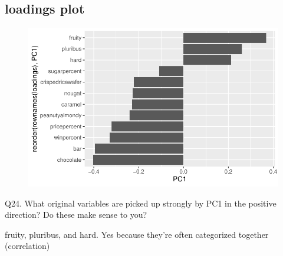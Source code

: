 \documentclass[
  letterpaper,
  DIV=11,
  numbers=noendperiod]{scrartcl}
\newenvironment{Shaded}{\begin{snugshade}}{\end{snugshade}}
\newcommand{\FunctionTok}[1]{\textcolor[rgb]{0.28,0.35,0.67}{#1}}
\newcommand{\NormalTok}[1]{\textcolor[rgb]{0.00,0.23,0.31}{#1}}
\newcommand{\OtherTok}[1]{\textcolor[rgb]{0.00,0.23,0.31}{#1}}
\newcommand{\SpecialCharTok}[1]{\textcolor[rgb]{0.37,0.37,0.37}{#1}}
\begin{document}
\hypertarget{loadings-plot}{%
\subsection{loadings plot}\label{loadings-plot}}

\begin{Shaded}
\end{Shaded}

\begin{figure}[H]

{\centering \includegraphics{Class-9_files/figure-pdf/unnamed-chunk-30-1.pdf}

}

\end{figure}

Q24. What original variables are picked up strongly by PC1 in the
positive direction? Do these make sense to you?

fruity, pluribus, and hard. Yes because they're often categorized
together (correlation)
\end{document}

